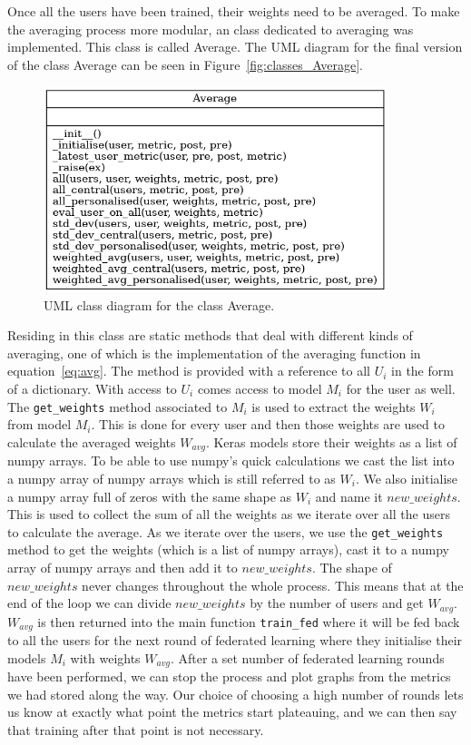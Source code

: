 \documentclass[12pt]{article}
\begin{document}
\\\\
Once all the users have been trained, their weights need to be averaged. To make the averaging process more modular, an class dedicated to averaging was implemented. This class is called Average. The UML diagram for the final version of the class Average can be seen in Figure~\ref{fig:classes_Average}.
\begin{figure}[H]
	\centering
	\includegraphics[width=10cm]{resources/classes_Average.png}
	\caption{UML class diagram for the class Average.}
	\label{fig:classes_user}
\end{figure}
\noindent Residing in this class are static methods that deal with different kinds of averaging, one of which is the implementation of the averaging function in equation~\ref{eq:avg}. The method is provided with a reference to all $U_i$ in the form of a dictionary. With access to $U_i$ comes access to model $M_i$ for the user as well. The \texttt{get\_weights} method associated to $M_i$ is used to extract the weights $W_i$ from model $M_i$. This is done for every user and then those weights are used to calculate the averaged weights $W_{avg}$. Keras models store their weights as a list of numpy arrays. To be able to use numpy's quick calculations we cast the list into a numpy array of numpy arrays which is still referred to as $W_i$. We also initialise a numpy array full of zeros with the same shape as $W_i$ and name it $new\_weights$. This is used to collect the sum of all the weights as we iterate over all the users to calculate the average. As we iterate over the users, we use the \texttt{get\_weights} method to get the weights (which is a list of numpy arrays), cast it to a numpy array of numpy arrays and then add it to $new\_weights$. The shape of $new\_weights$ never changes throughout the whole process. This means that at the end of the loop we can divide $new\_weights$ by the number of users and get $W_{avg}$. $W_{avg}$ is then returned into the main function \texttt{train\_fed} where it will be fed back to all the users for the next round of federated learning where they initialise their models $M_i$ with weights $W_{avg}$. After a set number of federated learning rounds have been performed, we can stop the process and plot graphs from the metrics we had stored along the way. Our choice of choosing a high number of rounds lets us know at exactly what point the metrics start plateauing, and we can then say that training after that point is not necessary. 
\end{document}

